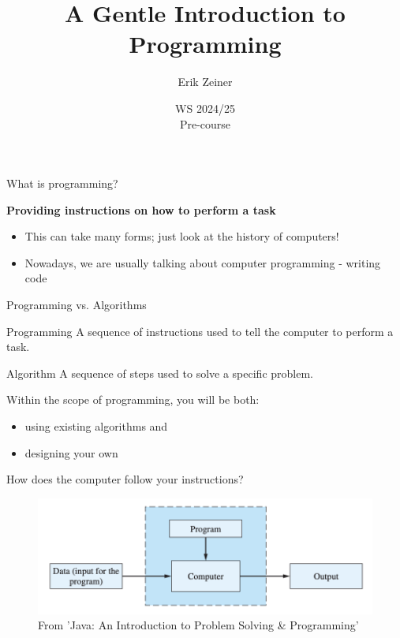 \documentclass[aspectratio=169,hyperref={unicode}]{beamer}
\title{A Gentle Introduction to Programming}
\author{Erik Zeiner}
\institute{Fachschaft General \& Computational Linguistics\\ \textbf{University of Tübingen}}
\date{WS 2024/25 \\ Pre-course}
\begin{document}
\frame{\titlepage}
\begin{frame}{What is programming?}

\begin{center}
	\Large\textbf{Providing instructions on how to perform a task}
\end{center}



\begin{itemize}
	\item This can take many forms; just look at the history of computers!
	\item Nowadays, we are usually talking about computer programming - writing code
\end{itemize}
	
\end{frame}
\begin{frame}{Programming vs. Algorithms}
	
\begin{block}{Programming}
	A sequence of instructions used to tell the computer to perform a task.
\end{block}
	
\begin{block}{Algorithm}
	A sequence of steps used to solve a specific problem.
\end{block}
 
\vfill

Within the scope of programming, you will be both:
\begin{itemize}
	\item using existing algorithms and
	\item designing your own
\end{itemize}

\end{frame}

\begin{frame}{How does the computer follow your instructions?}
\begin{figure}
\includegraphics[width=\linewidth]{Screenshot.png}  
\caption{From 'Java: An Introduction to Problem Solving \& Programming'}
\end{figure}
\end{frame}
\end{document}
